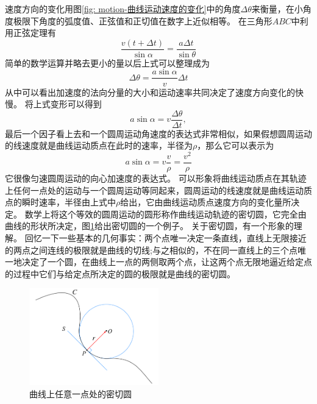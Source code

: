 速度方向的变化用图\ref{fig: motion-曲线运动速度的变化}中的角度$\Delta\theta$来衡量，在小角度极限下角度的弧度值、正弦值和正切值在数字上近似相等。
在三角形$ABC$中利用正弦定理有
\[
\frac{v(t+\Delta t)}{\sin\alpha}=\frac{a\Delta t}{\sin\theta}
\]
简单的数学运算并略去更小的量以后上式可以整理成为
\begin{equation}
\Delta\theta = \frac{a\sin\alpha }{v}\Delta t
\end{equation}
从中可以看出加速度的法向分量的大小和运动速率共同决定了速度方向变化的快慢。
将上式变形可以得到
\[
a\sin\alpha = v\frac{\Delta\theta}{\Delta t},
\]
最后一个因子看上去和一个圆周运动角速度的表达式非常相似，如果假想圆周运动的线速度就是曲线运动质点在此时的速率，半径为$\rho$，那么它可以表示为
\begin{equation}
a\sin\alpha = v\frac{v}{\rho} = \frac{v^2}{\rho}
\end{equation}
它很像匀速圆周运动的向心加速度的表达式。
可以形象将曲线运动质点在其轨迹上任何一点处的运动与一个圆周运动等同起来，圆周运动的线速度就是曲线运动质点的瞬时速率，半径由上式中$\rho$给出，它由曲线运动质点速度方向的变化量所决定。
数学上将这个等效的圆周运动的圆形称作曲线运动轨迹的{\heiti 密切圆}，它完全由曲线的形状所决定，图\ref{fig:Osculating_circle}给出密切圆的一个例子。
关于密切圆，有一个形象的理解。
回忆一下一些基本的几何事实：两个点唯一决定一条直线，直线上无限接近的两点之间连线的极限就是曲线的切线;与之相似的，不在同一直线上的三个点唯一地决定了一个圆，在曲线上一点的两侧取两个点，让这两个点无限地逼近给定点的过程中它们与给定点所决定的圆的极限就是曲线的密切圆。

\begin{figure}[ht]
\centering
\includegraphics[width=0.5\textwidth]{images/Osculating_circle}
\caption{曲线上任意一点处的密切圆}
\label{fig:Osculating_circle}
\end{figure}


